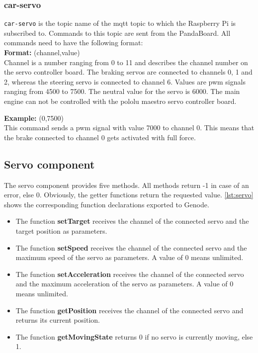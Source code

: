 \subsubsection{car-servo}
\label{sec:mqtt-car-servo}
\texttt{car-servo} is the topic name of the mqtt topic to which the Raspberry Pi is subscribed to. Commands to this topic are sent from the PandaBoard. All commands need to have the following format: \\ 

\textbf{Format:} (channel,value) \\
Channel is a number ranging from 0 to 11 and describes the channel number on the servo controller board. The braking servos are connected to channels 0, 1 and 2, whereas the steering servo is connected to channel 6. Values are pwm signals ranging from 4500 to 7500. The neutral value for the servo is 6000. The main engine can not be controlled with the pololu maestro servo controller board.

\textbf{Example:} (0,7500) \\
This command sends a pwm signal with value 7000 to channel 0. This means that the brake connected to channel 0 gets activated with full force. 




\subsection{Servo component}
\label{sec:comp-servo}

The servo component provides five methods. All methods return -1 in case of an error, else 0. Obviously, the getter functions return the requested value.
\autoref{lst:servo} shows the corresponding function declarations exported to Genode.
\begin{itemize}
\item The function \textbf{setTarget} receives the channel of the connected servo and the target position as parameters.
\item The function \textbf{setSpeed} receives the channel of the connected servo and the maximum speed of the servo as parameters. A value of 0 means unlimited.
\item The function \textbf{setAcceleration} receives the channel of the connected servo and the maximum acceleration of the servo as parameters. A value of 0 means unlimited.
\item The function \textbf{getPosition} receives the channel of the connected servo and returns its current position.
\item The function \textbf{getMovingState} returns 0 if no servo is currently moving, else 1.
\end{itemize}

